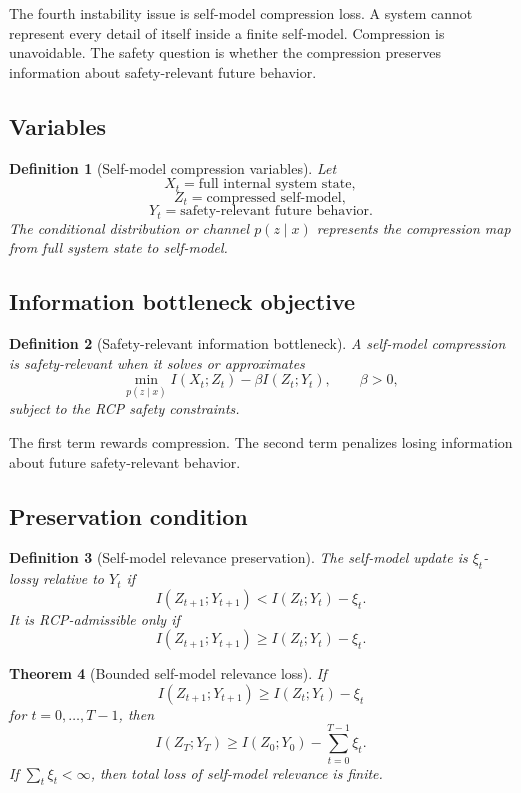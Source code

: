 \documentclass[11pt]{article}
\newtheorem{theorem}{Theorem}[section]
\newtheorem{definition}[theorem]{Definition}
\newcommand{\1}{\mathbf{1}}
\begin{document}
The fourth instability issue is self-model compression loss. A system cannot represent every detail of itself inside a finite self-model. Compression is unavoidable. The safety question is whether the compression preserves information about safety-relevant future behavior.

\subsection{Variables}

\begin{definition}[Self-model compression variables]
Let
\[
X_t=\text{full internal system state},
\]
\[
Z_t=\text{compressed self-model},
\]
\[
Y_t=\text{safety-relevant future behavior}.
\]
The conditional distribution or channel \(p(z\mid x)\) represents the compression map from full system state to self-model.
\end{definition}

\subsection{Information bottleneck objective}

\begin{definition}[Safety-relevant information bottleneck]
A self-model compression is safety-relevant when it solves or approximates
\[
\min_{p(z\mid x)} I(X_t;Z_t)-\beta I(Z_t;Y_t),
\qquad
\beta>0,
\]
subject to the RCP safety constraints.
\end{definition}

The first term rewards compression. The second term penalizes losing information about future safety-relevant behavior.

\subsection{Preservation condition}

\begin{definition}[Self-model relevance preservation]
The self-model update is \(\xi_t\)-lossy relative to \(Y_t\) if
\[
I(Z_{t+1};Y_{t+1})
<
I(Z_t;Y_t)-\xi_t.
\]
It is RCP-admissible only if
\[
\boxed{
I(Z_{t+1};Y_{t+1})
\ge
I(Z_t;Y_t)-\xi_t.
}
\]
\end{definition}

\begin{theorem}[Bounded self-model relevance loss]
If
\[
I(Z_{t+1};Y_{t+1})
\ge
I(Z_t;Y_t)-\xi_t
\]
for \(t=0,\dots,T-1\), then
\[
I(Z_T;Y_T)
\ge
I(Z_0;Y_0)-\sum_{t=0}^{T-1}\xi_t.
\]
If \(\sum_t\xi_t<\infty\), then total loss of self-model relevance is finite.
\end{theorem}
\end{document}
